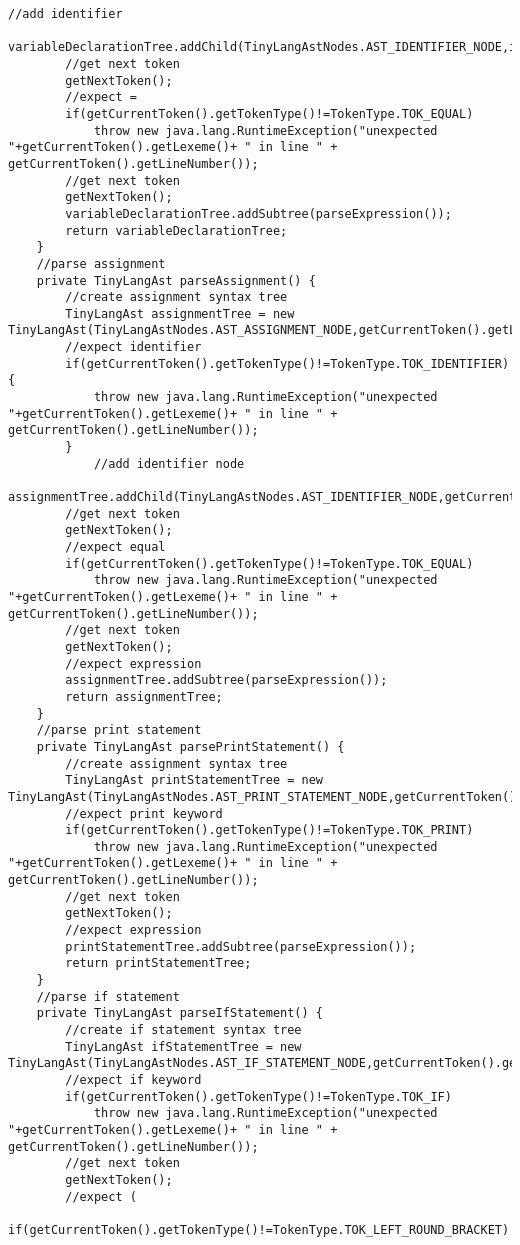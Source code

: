 \begin{lstlisting}[basicstyle=\miniscule,caption=Implementation of recursive descent parser,label=listing:rescursive descent parser implementation]
		//add identifier
		variableDeclarationTree.addChild(TinyLangAstNodes.AST_IDENTIFIER_NODE,identifier.getLexeme(),identifier.getLineNumber());
		//get next token
		getNextToken();
		//expect =
		if(getCurrentToken().getTokenType()!=TokenType.TOK_EQUAL)
			throw new java.lang.RuntimeException("unexpected "+getCurrentToken().getLexeme()+ " in line " + getCurrentToken().getLineNumber());
		//get next token
		getNextToken();
		variableDeclarationTree.addSubtree(parseExpression());
		return variableDeclarationTree;
	}
	//parse assignment 
	private TinyLangAst parseAssignment() {
		//create assignment syntax tree
		TinyLangAst assignmentTree = new TinyLangAst(TinyLangAstNodes.AST_ASSIGNMENT_NODE,getCurrentToken().getLineNumber());
		//expect identifier 
		if(getCurrentToken().getTokenType()!=TokenType.TOK_IDENTIFIER) {
			throw new java.lang.RuntimeException("unexpected "+getCurrentToken().getLexeme()+ " in line " + getCurrentToken().getLineNumber());
		}
			//add identifier node
		assignmentTree.addChild(TinyLangAstNodes.AST_IDENTIFIER_NODE,getCurrentToken().getLexeme(),getCurrentToken().getLineNumber());
		//get next token
		getNextToken();
		//expect equal
		if(getCurrentToken().getTokenType()!=TokenType.TOK_EQUAL)
			throw new java.lang.RuntimeException("unexpected "+getCurrentToken().getLexeme()+ " in line " + getCurrentToken().getLineNumber());
		//get next token
		getNextToken();
		//expect expression
		assignmentTree.addSubtree(parseExpression());
		return assignmentTree;
	}
	//parse print statement
	private TinyLangAst parsePrintStatement() {
		//create assignment syntax tree
		TinyLangAst printStatementTree = new TinyLangAst(TinyLangAstNodes.AST_PRINT_STATEMENT_NODE,getCurrentToken().getLineNumber());
		//expect print keyword
		if(getCurrentToken().getTokenType()!=TokenType.TOK_PRINT)
			throw new java.lang.RuntimeException("unexpected "+getCurrentToken().getLexeme()+ " in line " + getCurrentToken().getLineNumber());
		//get next token
		getNextToken();
		//expect expression
		printStatementTree.addSubtree(parseExpression());
		return printStatementTree;
	}
	//parse if statement
	private TinyLangAst parseIfStatement() {
		//create if statement syntax tree
		TinyLangAst ifStatementTree = new TinyLangAst(TinyLangAstNodes.AST_IF_STATEMENT_NODE,getCurrentToken().getLineNumber());
		//expect if keyword
		if(getCurrentToken().getTokenType()!=TokenType.TOK_IF)
			throw new java.lang.RuntimeException("unexpected "+getCurrentToken().getLexeme()+ " in line " + getCurrentToken().getLineNumber());
		//get next token
		getNextToken();
		//expect (
		if(getCurrentToken().getTokenType()!=TokenType.TOK_LEFT_ROUND_BRACKET)

\end{lstlisting}
